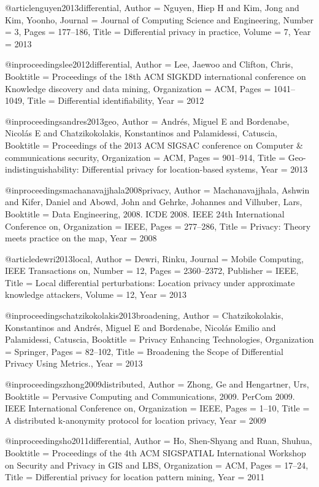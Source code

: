 {{{{{{{{{@article{nguyen2013differential,
	Author = {Nguyen, Hiep H and Kim, Jong and Kim, Yoonho},
	Journal = {Journal of Computing Science and Engineering},
	Number = {3},
	Pages = {177--186},
	Title = {Differential privacy in practice},
	Volume = {7},
	Year = {2013}}

@inproceedings{lee2012differential,
	Author = {Lee, Jaewoo and Clifton, Chris},
	Booktitle = {Proceedings of the 18th ACM SIGKDD international conference on Knowledge discovery and data mining},
	Organization = {ACM},
	Pages = {1041--1049},
	Title = {Differential identifiability},
	Year = {2012}}

@inproceedings{andres2013geo,
	Author = {Andr{\'e}s, Miguel E and Bordenabe, Nicol{\'a}s E and Chatzikokolakis, Konstantinos and Palamidessi, Catuscia},
	Booktitle = {Proceedings of the 2013 ACM SIGSAC conference on Computer \& communications security},
	Organization = {ACM},
	Pages = {901--914},
	Title = {Geo-indistinguishability: Differential privacy for location-based systems},
	Year = {2013}}

@inproceedings{machanavajjhala2008privacy,
	Author = {Machanavajjhala, Ashwin and Kifer, Daniel and Abowd, John and Gehrke, Johannes and Vilhuber, Lars},
	Booktitle = {Data Engineering, 2008. ICDE 2008. IEEE 24th International Conference on},
	Organization = {IEEE},
	Pages = {277--286},
	Title = {Privacy: Theory meets practice on the map},
	Year = {2008}}

@article{dewri2013local,
	Author = {Dewri, Rinku},
	Journal = {Mobile Computing, IEEE Transactions on},
	Number = {12},
	Pages = {2360--2372},
	Publisher = {IEEE},
	Title = {Local differential perturbations: Location privacy under approximate knowledge attackers},
	Volume = {12},
	Year = {2013}}

@inproceedings{chatzikokolakis2013broadening,
	Author = {Chatzikokolakis, Konstantinos and Andr{\'e}s, Miguel E and Bordenabe, Nicol{\'a}s Emilio and Palamidessi, Catuscia},
	Booktitle = {Privacy Enhancing Technologies},
	Organization = {Springer},
	Pages = {82--102},
	Title = {Broadening the Scope of Differential Privacy Using Metrics.},
	Year = {2013}}

@inproceedings{zhong2009distributed,
	Author = {Zhong, Ge and Hengartner, Urs},
	Booktitle = {Pervasive Computing and Communications, 2009. PerCom 2009. IEEE International Conference on},
	Organization = {IEEE},
	Pages = {1--10},
	Title = {A distributed k-anonymity protocol for location privacy},
	Year = {2009}}

@inproceedings{ho2011differential,
	Author = {Ho, Shen-Shyang and Ruan, Shuhua},
	Booktitle = {Proceedings of the 4th ACM SIGSPATIAL International Workshop on Security and Privacy in GIS and LBS},
	Organization = {ACM},
	Pages = {17--24},
	Title = {Differential privacy for location pattern mining},
	Year = {2011}}

}}}}}}}}}
